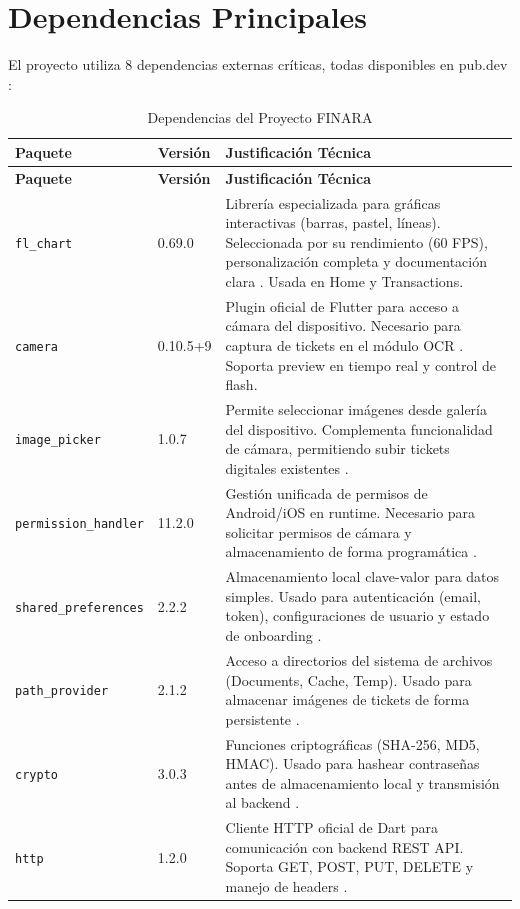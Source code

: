 \section{Dependencias Principales}

El proyecto utiliza 8 dependencias externas críticas, todas disponibles en pub.dev \cite{pub_dev}:

\small
\begin{longtable}{|p{3.9cm}|p{1.7cm}|p{7.3cm}|}
\caption{Dependencias del Proyecto FINARA} \\
\hline
\textbf{Paquete} & \textbf{Versión} & \textbf{Justificación Técnica} \\
\hline
\endfirsthead
\hline
\textbf{Paquete} & \textbf{Versión} & \textbf{Justificación Técnica} \\
\hline
\endhead
\hline
\endfoot

\texttt{fl\_chart} & 0.69.0 & Librería especializada para gráficas interactivas (barras, pastel, líneas). Seleccionada por su rendimiento (60 FPS), personalización completa y documentación clara \cite{fl_chart}. Usada en Home y Transactions. \\
\hline

\texttt{camera} & 0.10.5+9 & Plugin oficial de Flutter para acceso a cámara del dispositivo. Necesario para captura de tickets en el módulo OCR \cite{camera_plugin}. Soporta preview en tiempo real y control de flash. \\
\hline

\texttt{image\_picker} & 1.0.7 & Permite seleccionar imágenes desde galería del dispositivo. Complementa funcionalidad de cámara, permitiendo subir tickets digitales existentes \cite{image_picker}. \\
\hline

\texttt{permission\_handler} & 11.2.0 & Gestión unificada de permisos de Android/iOS en runtime. Necesario para solicitar permisos de cámara y almacenamiento de forma programática \cite{permission_handler}. \\
\hline

\texttt{shared\_preferences} & 2.2.2 & Almacenamiento local clave-valor para datos simples. Usado para autenticación (email, token), configuraciones de usuario y estado de onboarding \cite{shared_preferences}. \\
\hline

\texttt{path\_provider} & 2.1.2 & Acceso a directorios del sistema de archivos (Documents, Cache, Temp). Usado para almacenar imágenes de tickets de forma persistente \cite{path_provider}. \\
\hline

\texttt{crypto} & 3.0.3 & Funciones criptográficas (SHA-256, MD5, HMAC). Usado para hashear contraseñas antes de almacenamiento local y transmisión al backend \cite{crypto}. \\
\hline

\texttt{http} & 1.2.0 & Cliente HTTP oficial de Dart para comunicación con backend REST API. Soporta GET, POST, PUT, DELETE y manejo de headers \cite{http_package}. \\
\hline
\end{longtable}

